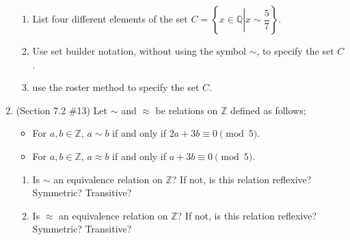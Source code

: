 \documentclass[letterpaper,12pt]{article}
\begin{document}
\begin{enumerate}
\begin{enumerate}
 \item List four different elements of the set $C = \left\{x\in \mathbb{Q} \left| x\sim\dfrac{5}{7}\right.\right\}$.
 \item Use set builder notation, without using the symbol $\sim$, to specify the set $C$.
 \item use the roster method to specify the set $C$.
\end{enumerate}
 \item (Section 7.2 \#13) Let $\sim$ and $\approx$ be relations on $\mathbb{Z}$ defined as follows;
\begin{itemize}
 \item For $a,b\in\mathbb{Z}$, $a\sim b$ if and only if $2a+3b\equiv 0 \pmod{5}$.
 \item For $a,b\in\mathbb{Z}$, $a\approx b$ if and only if $a+3b\equiv 0 \pmod{5}$.
\end{itemize}
\begin{enumerate}
 \item Is $\sim$ an equivalence relation on $\mathbb{Z}$? If not, is this relation reflexive? Symmetric? Transitive?
 \item Is $\approx$ an equivalence relation on $\mathbb{Z}$? If not, is this relation reflexive? Symmetric? Transitive?
\end{enumerate}

 \end{enumerate}
\end{document}
